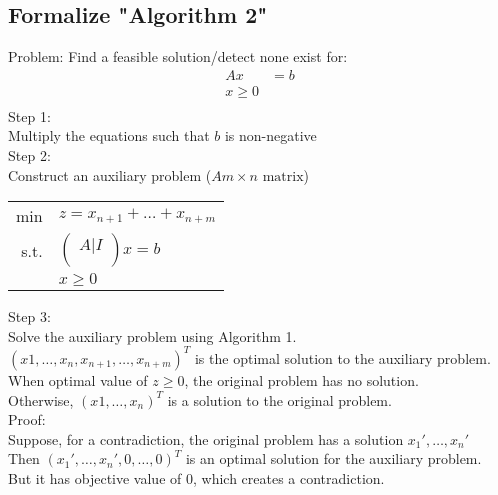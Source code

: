 \documentclass[letterpaper, 12pt]{article}
\begin{document}
    \subsection{Formalize "Algorithm 2"}
    Problem: Find a feasible solution/detect none exist for:\\
    \begin{align*}
        Ax &= b\\
        x\geq 0\\
    \end{align*}
    Step 1:\\
    Multiply the equations such that $b$ is non-negative\\
    Step 2:\\
    Construct an auxiliary problem ($A m \times n \text{ matrix}$)\\
    \begin{center}
        \begin{tabular}{rl}
            min & $z = x_{n+1} + \dots + x_{n+m}$\\
            s.t. & $\begin{pmatrix}
                A | I\\
            \end{pmatrix}x = b$\\
            &$x \geq 0$\\
        \end{tabular}
    \end{center}
    Step 3:\\
    Solve the auxiliary problem using Algorithm 1.\\
    $(x1, \dots, x_n, x_{n+1}, \dots, x_{n+m})^T$ is the optimal solution to the auxiliary problem.\\
    \bigskip
    When optimal value of $z \geq 0$, the original problem has no solution.\\
    Otherwise, $(x1, \dots, x_n)^T$ is a solution to the original problem.\\
    \bigskip
    Proof:\\
    Suppose, for a contradiction, the original problem has a solution $x_1', \dots, x_n'$\\
    Then $(x_1', \dots, x_n', 0, \dots, 0)^T$ is an optimal solution for the auxiliary problem.\\
    But it has objective value of 0, which creates a contradiction.\\
    \pagebreak
\end{document}
